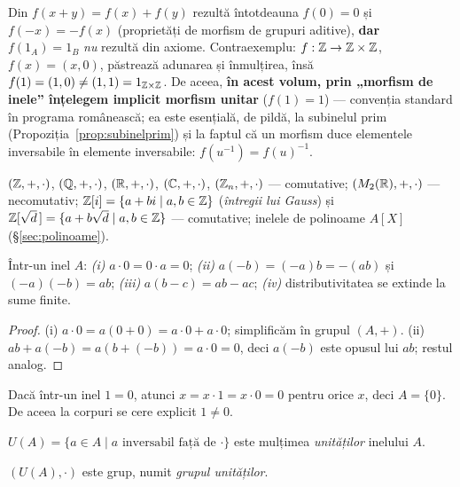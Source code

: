 \begin{observatie}[de ce $f(1)=1$ trebuie cerut separat]
Din $f(x+y)=f(x)+f(y)$ rezultă întotdeauna $f(0)=0$ și $f(-x)=-f(x)$ (proprietăți de morfism de grupuri aditive), \textbf{dar} $f(1_A)=1_B$ \emph{nu} rezultă din axiome. Contraexemplu: $f:\mathbb{Z}\to\mathbb{Z}\times\mathbb{Z}$, $f(x)=(x,0)$, păstrează adunarea și înmulțirea, însă $f(1)=(1,0)\neq(1,1)=1_{\mathbb{Z}\times\mathbb{Z}}$. De aceea, \textbf{în acest volum, prin „morfism de inele'' înțelegem implicit morfism unitar} ($f(1)=1$) --- convenția standard în programa românească; ea este esențială, de pildă, la subinelul prim (Propoziția~\ref{prop:subinelprim}) și la faptul că un morfism duce elementele inversabile în elemente inversabile: $f(u^{-1})=f(u)^{-1}$.
\end{observatie}

\begin{exemplu}
$(\mathbb{Z},+,\cdot)$, $(\mathbb{Q},+,\cdot)$, $(\mathbb{R},+,\cdot)$, $(\mathbb{C},+,\cdot)$, $(\mathbb{Z}_n,+,\cdot)$ --- comutative; $(M_2(\mathbb{R}),+,\cdot)$ --- necomutativ; $\mathbb{Z}[i]=\{a+bi\mid a,b\in\mathbb{Z}\}$ (\emph{întregii lui Gauss}) și $\mathbb{Z}[\sqrt d\,]=\{a+b\sqrt d\mid a,b\in\mathbb{Z}\}$ --- comutative; inelele de polinoame $A[X]$ (§\ref{sec:polinoame}).
\end{exemplu}

\begin{propozitie}\label{prop:reguli}
Într-un inel $A$: \emph{(i)} $a\cdot 0=0\cdot a=0$; \emph{(ii)} $a(-b)=(-a)b=-(ab)$ și $(-a)(-b)=ab$; \emph{(iii)} $a(b-c)=ab-ac$; \emph{(iv)} distributivitatea se extinde la sume finite.
\end{propozitie}

\begin{proof}
(i) $a\cdot0=a(0+0)=a\cdot0+a\cdot0$; simplificăm în grupul $(A,+)$. (ii) $ab+a(-b)=a(b+(-b))=a\cdot0=0$, deci $a(-b)$ este opusul lui $ab$; restul analog.
\end{proof}

\begin{observatie}
Dacă într-un inel $1=0$, atunci $x=x\cdot 1=x\cdot 0=0$ pentru orice $x$, deci $A=\{0\}$. De aceea la corpuri se cere explicit $1\neq 0$.
\end{observatie}

\begin{definitie}
$U(A)=\{a\in A\mid a\text{ inversabil față de }\cdot\}$ este mulțimea \emph{unităților} inelului $A$.
\end{definitie}

\begin{propozitie}
$(U(A),\cdot)$ este grup, numit \emph{grupul unităților}.
\end{propozitie}


